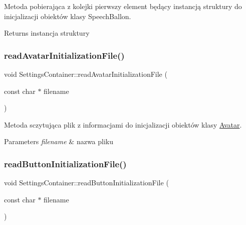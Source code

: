 Metoda pobierająca z kolejki pierwszy element będący instancją struktury do inicjalizacji obiektów klasy Speech\+Ballon. 

\begin{DoxyReturn}{Returns}
instancja struktury 
\end{DoxyReturn}
\mbox{\label{class_settings_container_aeb34f0b6cb059010e8dbd7349272c0a8}} 
\subsubsection{\texorpdfstring{readAvatarInitializationFile()}{readAvatarInitializationFile()}}
{\footnotesize\ttfamily void Settings\+Container\+::read\+Avatar\+Initialization\+File (\begin{DoxyParamCaption}\item[{const char $\ast$}]{filename }\end{DoxyParamCaption})}



Metoda sczytująca plik z informacjami do inicjalizacji obiektów klasy \mbox{\hyperlink{class_avatar}{Avatar}}. 


\begin{DoxyParams}{Parameters}
{\em filename} & nazwa pliku \\
\hline
\end{DoxyParams}
\mbox{\label{class_settings_container_a6b1f6f2c864c024f4ce39ae504840869}} 
\subsubsection{\texorpdfstring{readButtonInitializationFile()}{readButtonInitializationFile()}}
{\footnotesize\ttfamily void Settings\+Container\+::read\+Button\+Initialization\+File (\begin{DoxyParamCaption}\item[{const char $\ast$}]{filename }\end{DoxyParamCaption})}



